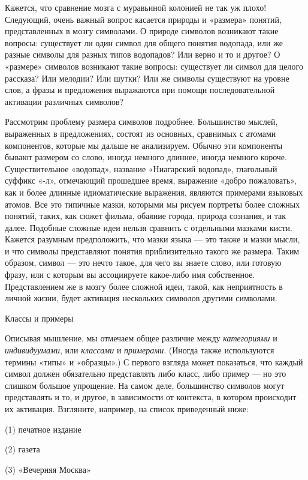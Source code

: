 \documentclass[../main.tex]{subfiles}
\begin{document}
Кажется, что сравнение мозга с муравьиной колонией не так уж плохо! Следующий, очень важный вопрос касается природы и «размера» понятий, представленных в мозгу символами. О природе символов возникают такие вопросы: существует ли один символ для общего понятия водопада, или же разные символы для разных типов водопадов? Или верно и то и другое? О «размере» символов возникают такие вопросы: существует ли символ для целого рассказа? Или мелодии? Или шутки? Или же символы существуют на уровне слов, а фразы и предложения выражаются при помощи последовательной активации различных символов?

Рассмотрим проблему размера символов подробнее. Большинство мыслей, выраженных в предложениях, состоят из основных, сравнимых с атомами компонентов, которые мы дальше не анализируем. Обычно эти компоненты бывают размером со слово, иногда немного длиннее, иногда немного короче. Существительное «водопад», название «Ниагарский водопад», глагольный суффикс «-л», отмечающий прошедшее время, выражение «добро пожаловать», как и более длинные идиоматические выражения, являются примерами языковых атомов. Все это типичные мазки, которыми мы рисуем портреты более сложных понятий, таких, как сюжет фильма, обаяние города, природа сознания, и так далее. Подобные сложные идеи нельзя сравнить с отдельными мазками кисти. Кажется разумным предположить, что мазки языка --- это также и мазки мысли, и что символы представляют понятия приблизительно такого же размера. Таким образом, символ --- это нечто такое, для чего вы знаете слово, или готовую фразу, или с которым вы ассоциируете какое-либо имя собственное. Представлением же в мозгу более сложной идеи, такой, как неприятность в личной жизни, будет активация нескольких символов другими символами.

Классы и примеры

Описывая мышление, мы отмечаем общее различие между \emph{категориями} и \emph{индивидуумами}, или \emph{классами} и \emph{примерами}. (Иногда также используются термины «типы» и «образцы».) С первого взгляда может показаться, что каждый символ должен обязательно представлять либо класс, либо пример --- но это слишком большое упрощение. На самом деле, большинство символов могут представлять и то, и другое, в зависимости от контекста, в котором происходит их активация. Взгляните, например, на список приведенный ниже:

(1) печатное издание

(2) газета

(3) «Вечерняя Москва»
\end{document}
